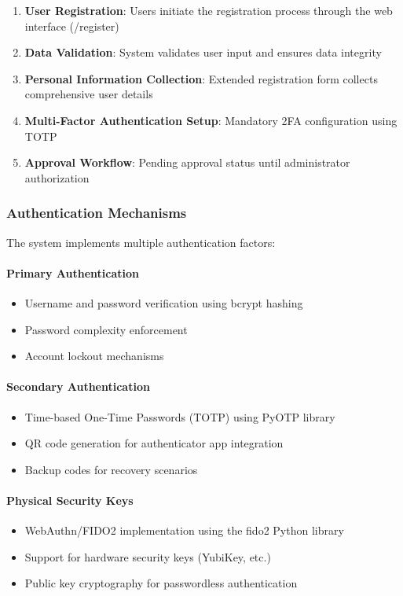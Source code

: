 \documentclass[12pt,a4paper]{article}
\begin{document}
\begin{enumerate}
    \item \textbf{User Registration}: Users initiate the registration process through the web interface (/register)
    \item \textbf{Data Validation}: System validates user input and ensures data integrity
    \item \textbf{Personal Information Collection}: Extended registration form collects comprehensive user details
    \item \textbf{Multi-Factor Authentication Setup}: Mandatory 2FA configuration using TOTP
    \item \textbf{Approval Workflow}: Pending approval status until administrator authorization
\end{enumerate}

\subsubsection{Authentication Mechanisms}
The system implements multiple authentication factors:

\paragraph{Primary Authentication}
\begin{itemize}
    \item Username and password verification using bcrypt hashing
    \item Password complexity enforcement
    \item Account lockout mechanisms
\end{itemize}

\paragraph{Secondary Authentication}
\begin{itemize}
    \item Time-based One-Time Passwords (TOTP) using PyOTP library
    \item QR code generation for authenticator app integration
    \item Backup codes for recovery scenarios
\end{itemize}

\paragraph{Physical Security Keys}
\begin{itemize}
    \item WebAuthn/FIDO2 implementation using the fido2 Python library
    \item Support for hardware security keys (YubiKey, etc.)
    \item Public key cryptography for passwordless authentication
\end{itemize}
\end{document}

